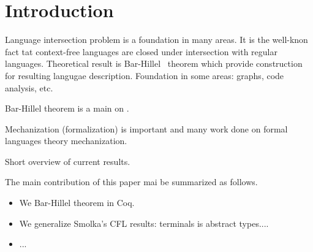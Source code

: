 \section{Introduction}

Language intersection problem is a foundation in many areas.
It is the well-knon fact tat context-free languages are closed under intersection with regular languages. 
Theoretical result is Bar-Hillel~\cite{bar1961formal} theorem which provide construction for resulting langugae description.
Foundation in some areas: graphs, code analysis, etc.

Bar-Hillel theorem is a main on .

Mechanization (formalization) is important and many work done on formal languages theory mechanization.

Short overview of current results.

The main contribution of this paper mai be summarized as follows.
\begin{itemize}
\item We Bar-Hillel theorem in Coq.
\item We generalize Smolka's CFL results: terminals is abstract types....
\item ...
\end{itemize}
